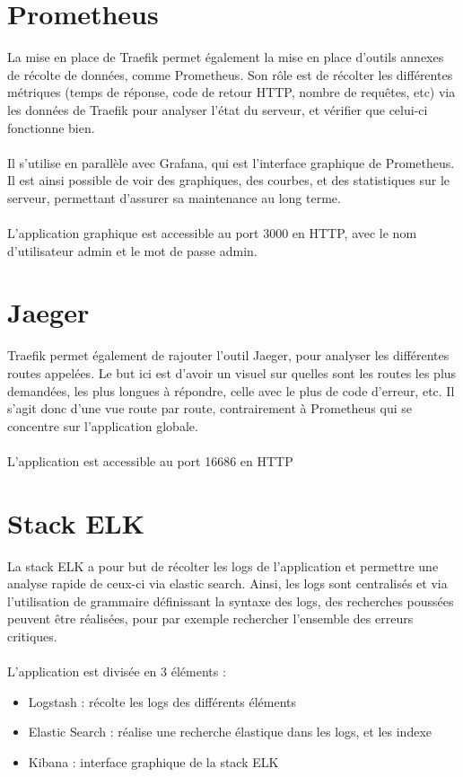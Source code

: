 \documentclass{article}
\begin{document}
    \section{Prometheus}

        La mise en place de Traefik permet également la mise en place d'outils annexes de récolte de données, comme Prometheus. Son rôle est de récolter les différentes métriques (temps de réponse, code de retour HTTP, nombre de requêtes, etc) via les données de Traefik pour analyser l'état du serveur, et vérifier que celui-ci fonctionne bien.\\
        \\
        \indent Il s'utilise en parallèle avec Grafana, qui est l'interface graphique de Prometheus. Il est ainsi possible de voir des graphiques, des courbes, et des statistiques sur le serveur, permettant d'assurer sa maintenance au long terme.\\
        \\
        L'application graphique est accessible au port 3000 en HTTP, avec le nom d'utilisateur admin et le mot de passe admin.

    \section{Jaeger}

        Traefik permet également de rajouter l'outil Jaeger, pour analyser les différentes routes appelées. Le but ici est d'avoir un visuel sur quelles sont les routes les plus demandées, les plus longues à répondre, celle avec le plus de code d'erreur, etc. Il s'agit donc d'une vue route par route, contrairement à Prometheus qui se concentre sur l'application globale.\\
        \\
        L'application est accessible au port 16686 en HTTP

    \section{Stack ELK}

        La stack ELK a pour but de récolter les logs de l'application et permettre une analyse rapide de ceux-ci via elastic search. Ainsi, les logs sont centralisés et via l'utilisation de grammaire définissant la syntaxe des logs, des recherches poussées peuvent être réalisées, pour par exemple rechercher l'ensemble des erreurs critiques.\\
        \\
        \indent L'application est divisée en 3 éléments :
        \begin{itemize}
            \item Logstash : récolte les logs des différents éléments
            \item Elastic Search : réalise une recherche élastique dans les logs, et les indexe
            \item Kibana : interface graphique de la stack ELK\\
        \end{itemize}
        
\end{document}
